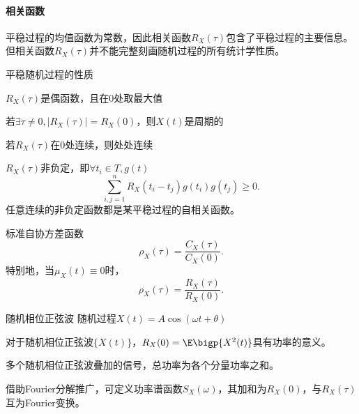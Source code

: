 \paragraph{相关函数}
平稳过程的均值函数为常数，因此相关函数$R_X(\tau)$包含了平稳过程的主要信息。但相关函数$R_X(\tau)$并不能完整刻画随机过程的所有统计学性质。
\begin{theorem}{平稳随机过程的性质}{}
	\begin{compactitem}
		\item $R_X(\tau)$是偶函数，且在0处取最大值
		\item 若$\exists\tau\neq 0,|R_X(\tau)|=R_X(0)$，则$X(t)$是周期的
		\item 若$R_X(\tau)$在0处连续，则处处连续
		\item $R_X(\tau)$非负定，即$\forall t_i\in T,g(t)$
		\[
			\sum_{i,j=1}^nR_X(t_i-t_j)g(t_i)g(t_j)\geqslant 0.
		\]
		任意连续的非负定函数都是某平稳过程的自相关函数。
	\end{compactitem}
\end{theorem}
标准自协方差函数
\[
	\rho_X(\tau)=\frac{C_X(\tau)}{C_X(0)}.
\]
特别地，当$\mu_X(t)\equiv 0$时，
\[
	\rho_X(\tau)=\frac{R_X(\tau)}{R_X(0)}.
\]
\begin{example}{随机相位正弦波}{}
	随机过程$X(t)=A\cos(\omega t+\theta)$
\end{example}
对于随机相位正弦波$\{X(t)\}$，$R_X(0)=\E\bigp{X^2(t)}$具有功率的意义。
\begin{compactitem}
	\item 多个随机相位正弦波叠加的信号，总功率为各个分量功率之和。
	\item 借助Fourier分解推广，可定义功率谱函数$S_X(\omega)$，其加和为$R_X(0)$，与$R_X(\tau)$互为Fourier变换。
\end{compactitem}

